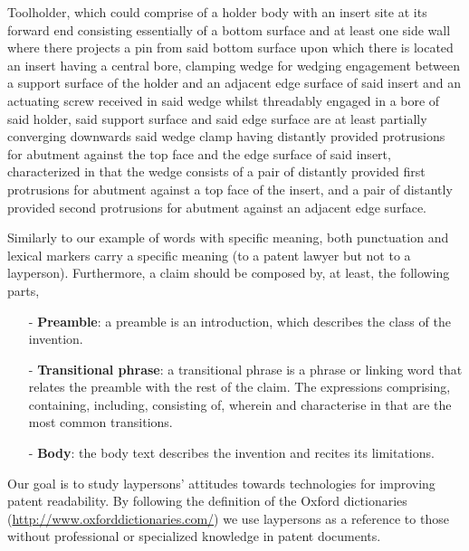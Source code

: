 \documentclass[11pt]{article}
\begin{document}
\vspace{0.5cm}
\begin{minipage}{11cm}
\begin{small}
\centering
\textsf{Toolholder, which could comprise of a holder body with an insert site at its forward end consisting essentially of a bottom surface and at least one side wall where there projects a pin from said bottom surface upon which there is located an insert having a central bore, clamping wedge for wedging engagement between a support surface of the holder and an adjacent edge surface of said insert and an actuating screw received in said wedge whilst threadably engaged in a bore of said holder, said support surface and said edge surface are at least partially converging downwards said wedge clamp having distantly provided protrusions for abutment against the top face and the edge surface of said insert, characterized in that the wedge consists of a pair of distantly provided first protrusions for abutment against a top face of the insert, and a pair of distantly provided second protrusions for abutment against   an adjacent edge surface.}
\end{small}
\end{minipage}
\vspace{0.5cm}

Similarly to our example of words with specific meaning, both punctuation and lexical markers carry a specific meaning (to a patent lawyer but not to a layperson).  
Furthermore, a claim should be composed by, at least, the following parts,

\begin{itemize}
\item[-] \textbf{Preamble}: a preamble is  an introduction, which describes the class of the invention.
\item[-] \textbf{Transitional phrase}:  a transitional phrase is a phrase or linking word that relates the preamble with the rest of the claim.
The expressions comprising, containing, including, consisting of, wherein and characterise
in that are the most common transitions.
\item[-] \textbf{Body}: the body text describes the invention and recites its limitations.
\end{itemize}

Our goal is to study laypersons' attitudes towards technologies for improving patent readability. By following the definition of the Oxford dictionaries (\url{http://www.oxforddictionaries.com/}) we use laypersons as a reference to those without professional or specialized knowledge in patent documents.
\end{document}
